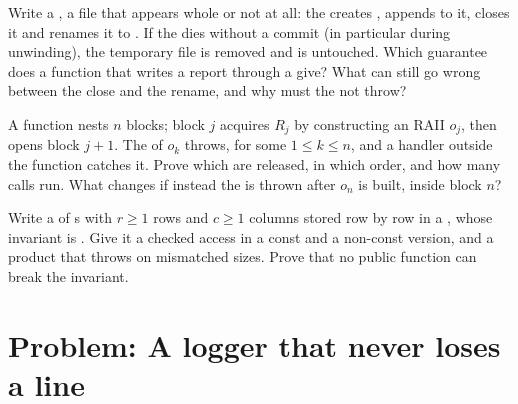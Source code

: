 \begin{exercise}[$\star\star\star$]\label{exo:b2:cpp-classes-raii:10}
Write a  , a file that appears whole or not at all: the  creates ,
 appends to it,  closes it and renames it to . If the  dies without a
commit (in particular during unwinding), the temporary file is removed and  is untouched. Which
guarantee does a function that writes a report through a  give? What can still go wrong between the
close and the rename, and why must the  not throw?
\end{exercise}

\begin{exercise}[$\star\star\star$]\label{exo:b2:cpp-classes-raii:11}
A function nests $n$ blocks; block $j$ acquires  $R_j$ by constructing an RAII  $o_j$, then opens block
$j+1$. The  of $o_k$ throws, for some $1 \le k \le n$, and a handler outside the function catches it. Prove
which  are released, in which order, and how many  calls run. What changes if instead the
 is thrown after $o_n$ is built, inside block $n$?
\end{exercise}

\begin{exercise}[$\star\star\star$]\label{exo:b2:cpp-classes-raii:12}
Write a   of s with $r \geq 1$ rows and $c \geq 1$ columns stored row by row in a
, whose invariant is . Give it a checked access
 in a const and a non-const version,  and a product that throws
 on mismatched sizes. Prove that no public function can break the invariant.
\end{exercise}

\section{Problem: A logger that never loses a line}\label{sec:b2:cpp-classes-raii:problem}

